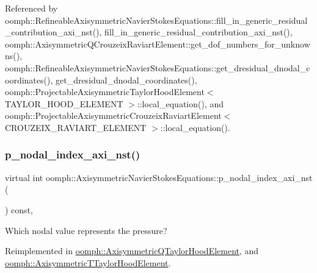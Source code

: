 Referenced by oomph\+::\+Refineable\+Axisymmetric\+Navier\+Stokes\+Equations\+::fill\+\_\+in\+\_\+generic\+\_\+residual\+\_\+contribution\+\_\+axi\+\_\+nst(), fill\+\_\+in\+\_\+generic\+\_\+residual\+\_\+contribution\+\_\+axi\+\_\+nst(), oomph\+::\+Axisymmetric\+Q\+Crouzeix\+Raviart\+Element\+::get\+\_\+dof\+\_\+numbers\+\_\+for\+\_\+unknowns(), oomph\+::\+Refineable\+Axisymmetric\+Navier\+Stokes\+Equations\+::get\+\_\+dresidual\+\_\+dnodal\+\_\+coordinates(), get\+\_\+dresidual\+\_\+dnodal\+\_\+coordinates(), oomph\+::\+Projectable\+Axisymmetric\+Taylor\+Hood\+Element$<$ T\+A\+Y\+L\+O\+R\+\_\+\+H\+O\+O\+D\+\_\+\+E\+L\+E\+M\+E\+N\+T $>$\+::local\+\_\+equation(), and oomph\+::\+Projectable\+Axisymmetric\+Crouzeix\+Raviart\+Element$<$ C\+R\+O\+U\+Z\+E\+I\+X\+\_\+\+R\+A\+V\+I\+A\+R\+T\+\_\+\+E\+L\+E\+M\+E\+N\+T $>$\+::local\+\_\+equation().

\mbox{\label{classoomph_1_1AxisymmetricNavierStokesEquations_a47c61dbb8a32fd785c99ab3aa8bc35f9}} 
\subsubsection{\texorpdfstring{p\+\_\+nodal\+\_\+index\+\_\+axi\+\_\+nst()}{p\_nodal\_index\_axi\_nst()}}
{\footnotesize\ttfamily virtual int oomph\+::\+Axisymmetric\+Navier\+Stokes\+Equations\+::p\+\_\+nodal\+\_\+index\+\_\+axi\+\_\+nst (\begin{DoxyParamCaption}{ }\end{DoxyParamCaption}) const\hspace{0.3cm}{\ttfamily [inline]}, {\ttfamily [virtual]}}



Which nodal value represents the pressure? 



Reimplemented in \hyperlink{classoomph_1_1AxisymmetricQTaylorHoodElement_a318c767e20198f6d3f8a5c788df31055}{oomph\+::\+Axisymmetric\+Q\+Taylor\+Hood\+Element}, and \hyperlink{classoomph_1_1AxisymmetricTTaylorHoodElement_a27deacb53ba98601b20dd06d9c812520}{oomph\+::\+Axisymmetric\+T\+Taylor\+Hood\+Element}.



